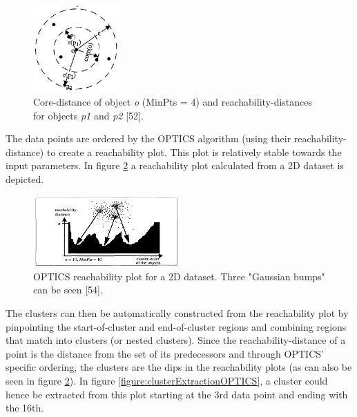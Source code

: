 \begin{figure}[h]
  \centering
  \includegraphics[width=0.3\textwidth]{./images/reachabilityDistanceOPTICS.png}
  \caption{Core-distance of object \textit{o} (MinPts = 4) and reachability-distances for objects \textit{p1} and \textit{p2} \autocite{OPTICS}[52].}
  \label{figure:reachabilityDistanceOPTICS}
\end{figure}


The data points are ordered by the OPTICS algorithm (using their reachability-distance) to create a reachability plot. This plot is relatively stable towards the input parameters. In figure \ref{figure:reachabilityPlotOPTICS} a reachability plot calculated from a 2D dataset is depicted. 

\begin{figure}[h]
  \centering
  \includegraphics[width=0.5\textwidth]{./images/reachabilityPlotOPTICS.png}
  \caption{OPTICS reachability plot for a 2D dataset. Three "Gaussian bumps" can be seen \autocite{OPTICS}[54].}
  \label{figure:reachabilityPlotOPTICS}
\end{figure}

The clusters can then be automatically constructed from the reachability plot by pinpointing the start-of-cluster and end-of-cluster regions and combining regions that match into clusters (or nested clusters). Since the reachability-distance of a point is the distance from the set of its predecessors and through OPTICS' specific ordering, the clusters are the dips in the reachability plots (as can also be seen in figure \ref{figure:reachabilityPlotOPTICS}). In figure \ref{figure:clusterExtractionOPTICS}, a cluster could hence be extracted from this plot starting at the 3rd data point and ending with the 16th.


